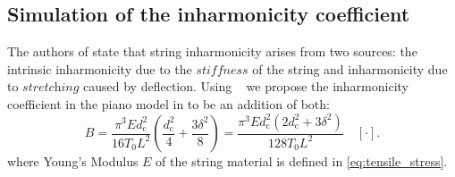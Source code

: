 \documentclass{article}
\begin{document}
\begin{sloppy}
\subsection{Simulation of the inharmonicity coefficient}\label{sec:Bsimulation}
The authors of \cite{coltShank} state that string inharmonicity arises from two sources: the intrinsic inharmonicity due to the $\textit{stiffness}$ of the string and inharmonicity due to $\textit{stretching}$ caused by deflection. Using%
~\cite{rossing:science_of_string_instruments} we propose the inharmonicity coefficient in the piano model in \cite{fletcher:piano_model} %
to be an addition of both:
\begin{equation}\label{eq:totalInharmonicity}
    B =  \frac {\pi^3 E d_\text{c}^2}{16 T_0 L^2}\left(\frac {d_\text{c}^2}{4}   +  \frac {3\delta^2}{8} \right)  =  \frac{\pi^3 E d_\text{c}^2(2d_\text{c}^2 + 3\delta^2)}{128 T_0 L^2}\quad [\cdot].
\end{equation}
where Young's Modulus $E$ of the string material is defined in \eqref{eq:tensile_stress}.
%
%

\end{sloppy}
\end{document}
